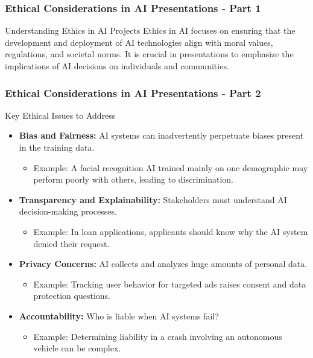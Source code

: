 \documentclass[aspectratio=169]{beamer}
\begin{document}
\begin{frame}[fragile]
    \frametitle{Ethical Considerations in AI Presentations - Part 1}
    \begin{block}{Understanding Ethics in AI Projects}
        Ethics in AI focuses on ensuring that the development and deployment of AI technologies align with moral values, regulations, and societal norms. 
        It is crucial in presentations to emphasize the implications of AI decisions on individuals and communities.
    \end{block}
\end{frame}

\begin{frame}[fragile]
    \frametitle{Ethical Considerations in AI Presentations - Part 2}
    \begin{block}{Key Ethical Issues to Address}
        \begin{itemize}
            \item \textbf{Bias and Fairness:}
                AI systems can inadvertently perpetuate biases present in the training data.
                \begin{itemize}
                    \item Example: A facial recognition AI trained mainly on one demographic may perform poorly with others, leading to discrimination.
                \end{itemize}
            \item \textbf{Transparency and Explainability:}
                Stakeholders must understand AI decision-making processes.
                \begin{itemize}
                    \item Example: In loan applications, applicants should know why the AI system denied their request.
                \end{itemize}
            \item \textbf{Privacy Concerns:}
                AI collects and analyzes huge amounts of personal data.
                \begin{itemize}
                    \item Example: Tracking user behavior for targeted ads raises consent and data protection questions.
                \end{itemize}
            \item \textbf{Accountability:}
                Who is liable when AI systems fail?
                \begin{itemize}
                    \item Example: Determining liability in a crash involving an autonomous vehicle can be complex.
                \end{itemize}
        \end{itemize}
    \end{block}
\end{frame}
\end{document}
